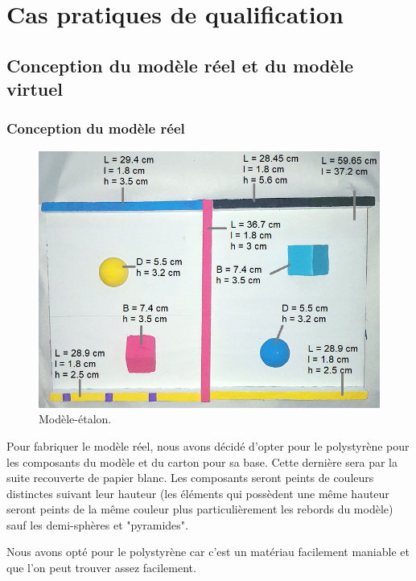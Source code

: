 \documentclass[a4paper, 12pt]{book}
\begin{document}
\chapter{Cas pratiques de qualification}

\section{Conception du modèle réel et du modèle virtuel}
\subsection{Conception du modèle réel}
\begin{center}
	\begin{figure}[htbp]
  		\hspace{0.75cm}
 		\includegraphics[scale=0.5]{images/realModel.png} \hspace{2cm}
  		\caption{Modèle-étalon.\label{fig-model}}
	\end{figure}
\end{center}

Pour fabriquer le modèle réel, nous avons décidé d'opter pour le polystyrène pour les composants du modèle et du carton pour sa base. Cette dernière sera par la suite recouverte de papier blanc. Les composants seront peints de couleurs distinctes suivant leur hauteur (les éléments qui possèdent une même hauteur seront peints de la même couleur plus particulièrement les rebords du modèle) sauf les demi-sphères et "pyramides".
\par Nous avons opté pour le polystyrène car c'est un matériau facilement maniable et que l'on peut trouver assez facilement. 
\end{document}
